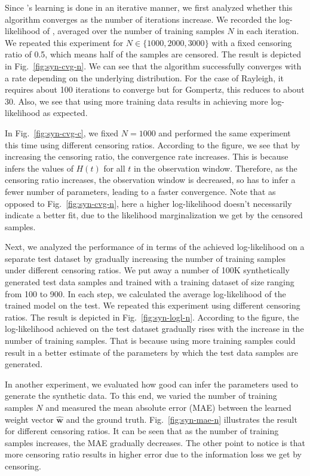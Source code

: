 Since \npglm's learning is done in an iterative manner, we first analyzed whether this algorithm converges as the number of iterations increase. We recorded the log-likelihood of \npglm, averaged over the number of training samples $N$ in each iteration. We repeated this experiment for $N\in\{1000,2000,3000\}$ with a fixed censoring ratio of 0.5, which means half of the samples are censored. The result is depicted in Fig.~\ref{fig:syn-cvg-n}. We can see that the algorithm successfully converges with a rate depending on the underlying distribution. For the case of Rayleigh, it requires about 100 iterations to converge but for Gompertz, this reduces to about 30. Also, we see that using more training data results in achieving more log-likelihood as expected.



In Fig.~\ref{fig:syn-cvg-c}, we fixed $N=1000$ and performed the same experiment this time using different censoring ratios. According to the figure, we see that by increasing the censoring ratio, the convergence rate increases. This is because \npglm infers the values of $H(t)$ for all $t$ in the observation window. Therefore, as the censoring ratio increases, the observation window is decreased, so \npglm has to infer a fewer number of parameters, leading to a faster convergence. Note that as opposed to Fig.~\ref{fig:syn-cvg-n}, here a higher log-likelihood doesn't necessarily indicate a better fit, due to the likelihood marginalization we get by the censored samples.


Next, we analyzed the performance of \npglm in terms of the achieved log-likelihood on a separate test dataset by gradually increasing the number of training samples under different censoring ratios. We put away a number of 100K synthetically generated test data samples and trained \npglm with a training dataset of size ranging from 100 to 900. In each step, we calculated the average log-likelihood of the trained model on the test. We repeated this experiment using different censoring ratios. The result is depicted in Fig.~\ref{fig:syn-logl-n}. According to the figure, the log-likelihood achieved on the test dataset gradually rises with the increase in the number of training samples. That is because using more training samples could result in a better estimate of the parameters by which the test data samples are generated.

In another experiment, we evaluated how good \npglm can infer the parameters used to generate the synthetic data. To this end, we varied the number of training samples $N$ and measured the mean absolute error (MAE) between the learned weight vector $\hat{\mathbf{w}}$ and the ground truth. Fig.~\ref{fig:syn-mae-n} illustrates the result for different censoring ratios. It can be seen that as the number of training samples increases, the MAE gradually decreases. The other point to notice is that more censoring ratio results in higher error due to the information loss we get by censoring.



